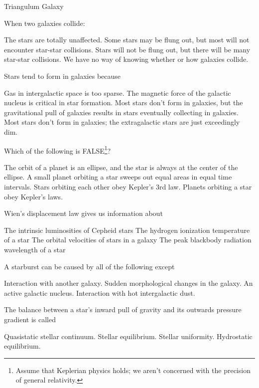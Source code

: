 \documentclass{exam}
\begin{document}
\begin{multicols*}{2}
\begin{questions}
\begin{choices}
		\choice Triangulum Galaxy
	\end{choices}
	\question When two galaxies collide:
	\begin{choices}
		\choice The stars are totally unaffected.
		\CorrectChoice Some stars may be flung out, but most will not encounter star-star collisions.
		\choice Stars will not be flung out, but there will be many star-star collisions.
		\choice We have no way of knowing whether or how galaxies collide.
	\end{choices}
	\vfill\null\columnbreak
	\question Stars tend to form in galaxies because
	\begin{choices}
		\CorrectChoice Gas in intergalactic space is too sparse.
		\choice The magnetic force of the galactic nucleus is critical in star formation.
		\choice Most stars don’t form in galaxies, but the gravitational pull of galaxies results in stars eventually collecting in galaxies.
		\choice Most stars don’t form in galaxies; the extragalactic stars are just exceedingly dim.
	\end{choices}
	\question Which of the following is FALSE\footnote{Assume that Keplerian physics holds; we aren't concerned with the precision of general relativity.}?
	\begin{choices}
		\CorrectChoice The orbit of a planet is an ellipse, and the star is always at the center of the ellipse.
		\choice A small planet orbiting a star sweeps out equal areas in equal time intervals.
		\choice Stars orbiting each other obey Kepler’s 3rd law.
		\choice Planets orbiting a star obey Kepler’s laws.
	\end{choices}
	\question Wien’s displacement law gives us information about
	\begin{choices}
		\choice The intrinsic luminosities of Cepheid stars
		\choice The hydrogen ionization temperature of a star
		\choice The orbital velocities of stars in a galaxy
		\CorrectChoice The peak blackbody radiation wavelength of a star
	\end{choices}
	\question A starburst can be caused by all of the following except
	\begin{choices}
		\choice Interaction with another galaxy.
		\choice Sudden morphological changes in the galaxy.
		\CorrectChoice An active galactic nucleus.
		\choice Interaction with hot intergalactic dust.
	\end{choices}
	\question The balance between a star’s inward pull of gravity and its outwards pressure gradient is called
	\begin{choices}
		\choice Quasistatic stellar continuum.
		\choice Stellar equilibrium.
		\choice Stellar uniformity.
		\CorrectChoice Hydrostatic equilibrium.
	\end{choices}
\end{questions}
\end{multicols*}
\renewcommand{\choiceshook}{}
\renewcommand{\questionshook}{}
\end{document}
